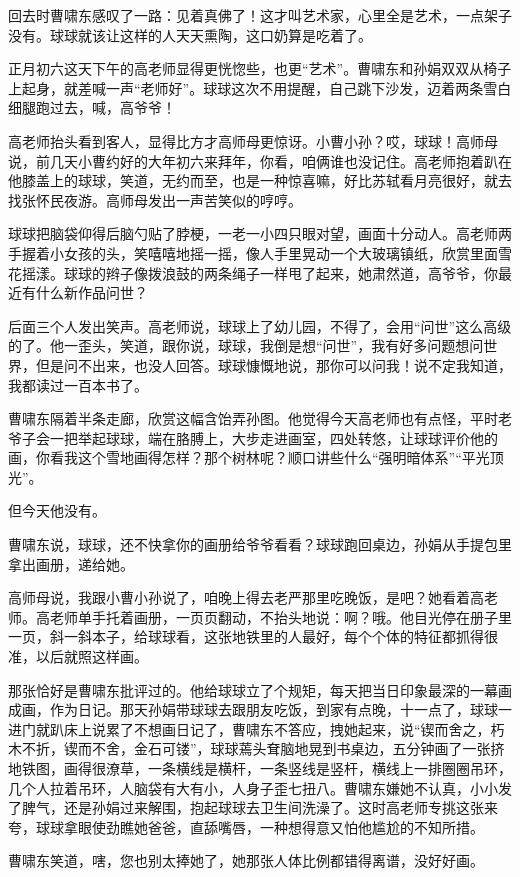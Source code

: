 \documentclass[lang=cn,newtx,12pt,scheme=chinese]{elegantbook}
\begin{document}
回去时曹啸东感叹了一路：见着真佛了！这才叫艺术家，心里全是艺术，一点架子没有。球球就该让这样的人天天熏陶，这口奶算是吃着了。

正月初六这天下午的高老师显得更恍惚些，也更“艺术”。曹啸东和孙娟双双从椅子上起身，就差喊一声“老师好”。球球这次不用提醒，自己跳下沙发，迈着两条雪白细腿跑过去，喊，高爷爷！

高老师抬头看到客人，显得比方才高师母更惊讶。小曹小孙？哎，球球！高师母说，前几天小曹约好的大年初六来拜年，你看，咱俩谁也没记住。高老师抱着趴在他膝盖上的球球，笑道，无约而至，也是一种惊喜嘛，好比苏轼看月亮很好，就去找张怀民夜游。高师母发出一声苦笑似的哼哼。

球球把脑袋仰得后脑勺贴了脖梗，一老一小四只眼对望，画面十分动人。高老师两手握着小女孩的头，笑嘻嘻地摇一摇，像人手里晃动一个大玻璃镇纸，欣赏里面雪花摇漾。球球的辫子像拨浪鼓的两条绳子一样甩了起来，她肃然道，高爷爷，你最近有什么新作品问世？

后面三个人发出笑声。高老师说，球球上了幼儿园，不得了，会用“问世”这么高级的了。他一歪头，笑道，跟你说，球球，我倒是想“问世”，我有好多问题想问世界，但是问不出来，也没人回答。球球慷慨地说，那你可以问我！说不定我知道，我都读过一百本书了。

曹啸东隔着半条走廊，欣赏这幅含饴弄孙图。他觉得今天高老师也有点怪，平时老爷子会一把举起球球，端在胳膊上，大步走进画室，四处转悠，让球球评价他的画，你看我这个雪地画得怎样？那个树林呢？顺口讲些什么“强明暗体系”“平光顶光”。

但今天他没有。

曹啸东说，球球，还不快拿你的画册给爷爷看看？球球跑回桌边，孙娟从手提包里拿出画册，递给她。

高师母说，我跟小曹小孙说了，咱晚上得去老严那里吃晚饭，是吧？她看着高老师。高老师单手托着画册，一页页翻动，不抬头地说：啊？哦。他目光停在册子里一页，斜一斜本子，给球球看，这张地铁里的人最好，每个个体的特征都抓得很准，以后就照这样画。

那张恰好是曹啸东批评过的。他给球球立了个规矩，每天把当日印象最深的一幕画成画，作为日记。那天孙娟带球球去跟朋友吃饭，到家有点晚，十一点了，球球一进门就趴床上说累了不想画日记了，曹啸东不答应，拽她起来，说“锲而舍之，朽木不折，锲而不舍，金石可镂”，球球蔫头耷脑地晃到书桌边，五分钟画了一张挤地铁图，画得很潦草，一条横线是横杆，一条竖线是竖杆，横线上一排圈圈吊环，几个人拉着吊环，人脑袋有大有小，人身子歪七扭八。曹啸东嫌她不认真，小小发了脾气，还是孙娟过来解围，抱起球球去卫生间洗澡了。这时高老师专挑这张来夸，球球拿眼使劲瞧她爸爸，直舔嘴唇，一种想得意又怕他尴尬的不知所措。

曹啸东笑道，嗐，您也别太捧她了，她那张人体比例都错得离谱，没好好画。
\end{document}
